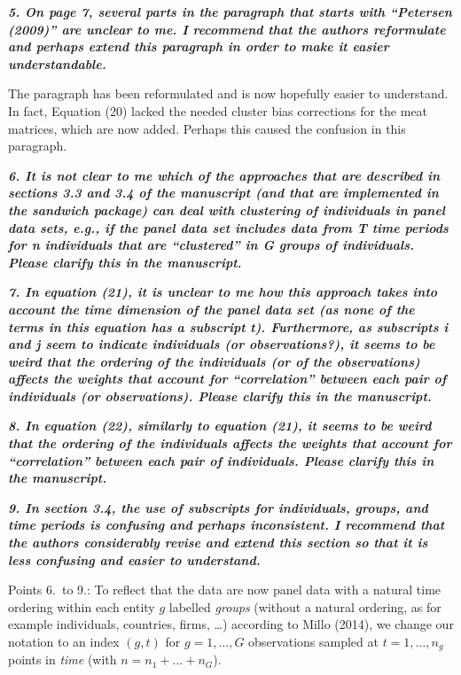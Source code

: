 \documentclass[10pt,a4paper]{article}
\begin{document}
\medskip

\textbf{\textit{5. On page 7, several parts in the paragraph that starts with ``Petersen (2009)'' are unclear
to me. I recommend that the authors reformulate and perhaps extend this paragraph in
order to make it easier understandable.}}

\medskip

The paragraph has been reformulated and is now hopefully easier to understand. In fact, Equation (20) lacked the needed cluster bias corrections for the meat matrices, which are now added. Perhaps this caused the confusion in this paragraph.

\medskip

\textbf{\textit{6. It is not clear to me which of the approaches that are described in sections 3.3 and 3.4
of the manuscript (and that are implemented in the sandwich package) can deal with clustering of individuals in panel data sets, e.g., if the panel data set includes data from T time periods for n individuals that are ``clustered'' in G groups of individuals. Please clarify this in the manuscript.}}

\medskip

\textbf{\textit{7. In equation (21), it is unclear to me how this approach takes into account the time
dimension of the panel data set (as none of the terms in this equation has a subscript t).
Furthermore, as subscripts i and j seem to indicate individuals (or observations?), it
seems to be weird that the ordering of the individuals (or of the observations) affects the
weights that account for ``correlation'' between each pair of individuals (or observations).
Please clarify this in the manuscript.}}

\medskip

\textbf{\textit{8. In equation (22), similarly to equation (21), it seems to be weird that the ordering of
the individuals affects the weights that account for ``correlation'' between each pair of
individuals. Please clarify this in the manuscript.}}

\medskip

\textbf{\textit{9. In section 3.4, the use of subscripts for individuals, groups, and time periods is confusing
and perhaps inconsistent. I recommend that the authors considerably revise and extend
this section so that it is less confusing and easier to understand.}}

\medskip

 Points 6.~to 9.: To reflect that the data are now panel data with a natural time ordering within each entity $g$ labelled \emph{groups} (without a natural ordering, as for example individuals, countries, firms, \ldots) according to Millo (2014), we change our notation
to an index $(g, t)$ for $g = 1, \dots, G$ observations sampled at $t = 1, \ldots, n_g$ points in \emph{time} (with $n = n_1 + \dots + n_G$).
\end{document}
